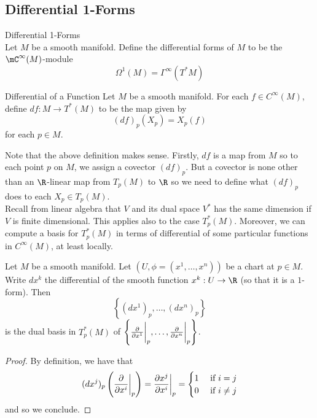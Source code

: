 \documentclass[a4paper]{article}
\begin{document}
\subsection{Differential 1-Forms}
\begin{defn}{Differential 1-Forms}{}\\
Let $M$ be a smooth manifold. Define the differential forms of $M$ to be the $\mC^\infty(M)$-module $$\Omega^1(M)=\Gamma^\infty(T^\ast M)$$
\end{defn}

\begin{defn}{Differential of a Function}{} Let $M$ be a smooth manifold. For each $f\in C^\infty(M)$, define $df:M\to T^\ast(M)$ to be the map given by $$(df)_p(X_p)=X_p(f)$$ for each $p\in M$. 
\end{defn}

Note that the above definition makes sense. Firstly, $df$ is a map from $M$ so to each point $p$ on $M$, we assign a covector $(df)_p$. But a covector is none other than an $\R$-linear map from $T_p(M)$ to $\R$ so we need to define what $(df)_p$ does to each $X_p\in T_p(M)$. \\

Recall from linear algebra that $V$ and its dual space $V^\ast$ has the same dimension if $V$ is finite dimensional. This applies also to the case $T_p^\ast(M)$. Moreover, we can compute a basis for $T_p^\ast(M)$ in terms of differential of some particular functions in $C^\infty(M)$, at least locally. 

\begin{prp}{}{} Let $M$ be a smooth manifold. Let $(U,\phi=(x^1,\dots,x^n))$ be a chart at $p\in M$. Write $dx^k$ the differential of the smooth function $x^k:U\to\R$ (so that it is a $1$-form). Then $$\left\{(dx^1)_p,\dots,(dx^n)_p\right\}$$ is the dual basis in $T_p^\ast(M)$ of $\left\{\frac{\partial}{\partial x^1}\bigg\vert_p,\dots,\frac{\partial}{\partial x^n}\bigg{|}_p\right\}$. 
\begin{proof}
By definition, we have that $$(dx^j)_p\left(\frac{\partial}{\partial x^i}\bigg{|}_p\right)=\frac{\partial x^j}{\partial x^i}\bigg{|}_p=\begin{cases}
1 & \text{ if } i=j\\
0 & \text{ if } i\neq j
\end{cases}$$
and so we conclude. 
\end{proof}
\end{prp}
\end{document}

